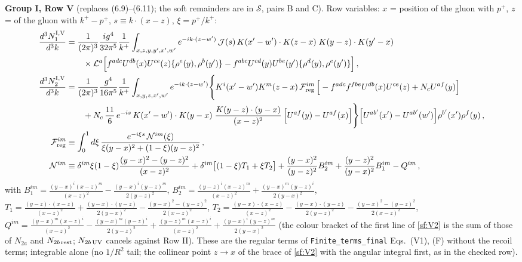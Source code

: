 \documentclass[10pt]{article}
\begin{document}
\noindent\textbf{Group I, Row V} (replaces (6.9)--(6.11); the soft remainders are in $\mathcal{S}$, pairs B and C). Row variables: $x$ = position of the gluon with $p^{+}$, $z$ = of the gluon with $k^{+}-p^{+}$, $s\equiv k\cdot(x-z)$, $\xi=p^{+}/k^{+}$:
\begin{align}
\frac{d^{3}N^{\rm I,V}_{1}}{d^{3}k}&=\frac{1}{(2\pi)^{3}}\frac{ig^{4}}{32\pi^{5}}\frac{1}{k^{+}}\int_{x,z,y,y',x',w'}e^{-ik\cdot(z-w')}\,\mathcal{J}(s)\,K(x'-w')\cdot K(z-x)\;K(y-z)\cdot K(y'-x)\notag\\
&\qquad\times\mathcal{L}^{a}\Big[f^{adc}U^{db}(x)U^{ce}(z)\{\rho^{e}(y),\rho^{b}(y')\}-f^{abc}U^{cd}(y)U^{be}(y')\{\rho^{d}(y),\rho^{e}(y')\}\Big]\,,\label{sf:V1}\\
\frac{d^{3}N^{\rm I,V}_{2}}{d^{3}k}&=\frac{1}{(2\pi)^{3}}\frac{g^{4}}{16\pi^{5}}\frac{1}{k^{+}}\int_{x,y,z,x',w'}e^{-ik\cdot(z-w')}\Bigg\{K^{i}(x'-w')K^{m}(z-x)\,\mathcal{F}^{im}_{\rm reg}\,\Big[-f^{adc}f^{fbe}U^{db}(x)U^{ce}(z)+N_{c}U^{af}(y)\Big]\notag\\
&\qquad+N_{c}\,\frac{11}{6}\,e^{-is}\,K(x'-w')\cdot K(y-x)\;\frac{K(y-z)\cdot(y-x)}{(x-z)^{2}}\,\Big[U^{af}(y)-U^{af}(x)\Big]\Bigg\}\Big[U^{ab'}(x')-U^{ab'}(w')\Big]\rho^{b'}(x')\rho^{f}(y)\,,\label{sf:V2}\\
\mathcal{F}^{im}_{\rm reg}&\equiv\int_{0}^{1}d\xi\,\frac{e^{-i\xi s}\,\mathcal{N}^{im}(\xi)}{\xi(y-x)^{2}+(1-\xi)(y-z)^{2}}\,,\notag\\
\mathcal{N}^{im}&\equiv\delta^{im}\xi(1-\xi)\frac{(y-x)^{2}-(y-z)^{2}}{(x-z)^{2}}+\delta^{im}\big[(1-\xi)T_{1}+\xi T_{2}\big]+\frac{(y-x)^{2}}{(y-z)^{2}}B_{2}^{im}+\frac{(y-z)^{2}}{(y-x)^{2}}B_{1}^{im}-Q^{im}\,,\notag
\end{align}
with $B_{1}^{im}=\frac{(y-x)^{i}(x-z)^{m}}{(x-z)^{2}}-\frac{(y-x)^{i}(y-z)^{m}}{2(y-z)^{2}}$, $B_{2}^{im}=\frac{(y-z)^{i}(x-z)^{m}}{(x-z)^{2}}+\frac{(y-x)^{m}(y-z)^{i}}{2(y-x)^{2}}$, $T_{1}=\frac{(y-z)\cdot(x-z)}{(x-z)^{2}}+\frac{(y-x)\cdot(y-z)}{2(y-x)^{2}}-\frac{(y-x)^{2}-(y-z)^{2}}{2(x-z)^{2}}$, $T_{2}=\frac{(y-x)\cdot(x-z)}{(x-z)^{2}}-\frac{(y-x)\cdot(y-z)}{2(y-z)^{2}}-\frac{(y-x)^{2}-(y-z)^{2}}{2(x-z)^{2}}$, $Q^{im}=\frac{(y-x)^{m}(x-z)^{i}}{(x-z)^{2}}-\frac{(y-x)^{m}(y-z)^{i}}{2(y-z)^{2}}+\frac{(y-z)^{m}(x-z)^{i}}{(x-z)^{2}}+\frac{(y-x)^{i}(y-z)^{m}}{2(y-x)^{2}}$ (the colour bracket of the first line of \eqref{sf:V2} is the sum of those of $N_{2a}$ and $N_{2b\,\rm rest}$; $N_{2b\,\rm UV}$ cancels against Row II). These are the regular terms of \texttt{Finite\_terms\_final} Eqs.~(V1), (F) without the recoil terms; integrable alone (no $1/R^{2}$ tail; the collinear point $z\to x$ of the brace of \eqref{sf:V2} with the angular integral first, as in the checked row).
\end{document}

